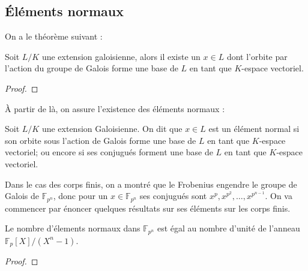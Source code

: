 \documentclass[a4paper]{article} %
\numberwithin{section}{part}
\numberwithin{equation}{section}
\newcommand\GF[1]{\mathbb{F}_{#1}}
\begin{document}
\subsection{Éléments normaux}
\label{sec:elemnorm}
On a le théorème suivant :
\begin{thm}
Soit $L/K$ une extension galoisienne, alors il existe un $x\in L$ dont l'orbite
par l'action du groupe de Galois forme une base de $L$ en tant que $K$-espace
vectoriel.
\end{thm}
\begin{proof}
\end{proof}
À partir de là, on assure l'existence des éléments normaux :

\begin{defn}
Soit $L/K$ une extension Galoisienne. On dit que $x\in L$ est un élément normal
si son orbite sous l'action de Galois forme une base de $L$ en tant que
$K$-espace vectoriel; ou encore si ses conjugués forment une base de $L$ en tant
que $K$-espace vectoriel.
\end{defn}
Dans le cas des corps finis, on a montré que le Frobenius engendre le groupe de
Galois de $\GF{p^n}$, donc pour un $x\in\GF{p^n}$ ses conjugués sont $x^p,
x^{p^2},\dots,x^{p^{n-1}}$. On va commencer par énoncer quelques résultats sur 
ses éléments sur les corps finis.

\begin{thm}
\label{th:nbelemnorm}
Le nombre d'élements normaux dans $\GF{p^n}$ est égal au nombre d'unité de
l'anneau $\GF{p}[X]/(X^n - 1)$.
\end{thm}
\begin{proof}
\end{proof}
\end{document}

